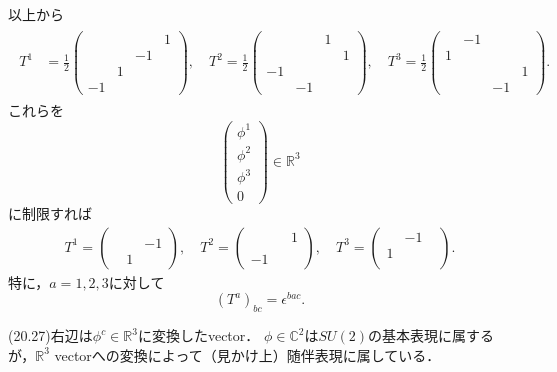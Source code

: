 以上から
\begin{align}
  \begin{split}
    T^1 &= \frac{1}{2}
    \begin{pmatrix}
      & & & 1 \\ & & -1 & \\ & 1 & & \\ -1 & & &
    \end{pmatrix}
    , \quad
    T^2 = \frac{1}{2}
    \begin{pmatrix}
      & & 1 & \\ & & & 1 \\ -1 & & & \\ & -1 & &
    \end{pmatrix}
    , \quad
    T^3 = \frac{1}{2}
    \begin{pmatrix}
      & -1 & & \\ 1 & & & \\ & & & 1 \\ & & -1 &
    \end{pmatrix}
    .
  \end{split}
  \label{20_27_TR4}
\end{align}
これらを
\[
\begin{pmatrix}
  \phi^1 \\ \phi^2 \\ \phi^3 \\ 0
\end{pmatrix}
\in \mathbb{R}^3
\]
に制限すれば
\begin{align}
  T^1 =
  \begin{pmatrix}
    & & \\ & & -1 \\ & 1 &
  \end{pmatrix}
  , \quad
  T^2 =
  \begin{pmatrix}
    & & 1\\ & &  \\ -1 & &
  \end{pmatrix}
  , \quad
  T^3 =
  \begin{pmatrix}
    & -1 & \\ 1 & & \\ & &
  \end{pmatrix}
  .
\label{20_27_TR3}
\end{align}
特に，\(a=1, 2, 3\)に対して
\[ (T^a)_{bc} = \epsilon^{bac} .  \]

(20.27)右辺は\(\phi^c \in \mathbb{R}^3\)に変換したvector．
\(\phi \in \mathbb{C}^2\)は\(SU(2)\)の基本表現に属するが，\(\mathbb{R}^3\) vectorへの変換によって（見かけ上）随伴表現に属している．

